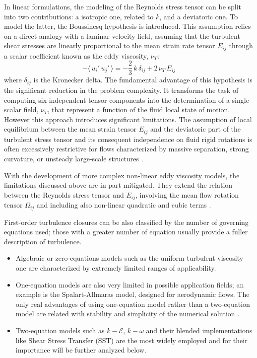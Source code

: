 \documentclass[12pt, a4paper, twoside, openright]{book}
\begin{document}
In linear formulations, the modeling of the Reynolds stress tensor can be split into two contributions: a isotropic one, related to $k$, and a deviatoric one. To model the latter, the Boussinesq hypothesis is introduced. This assumption relies on a direct analogy with a laminar velocity field, assuming that the turbulent shear stresses are linearly proportional to the mean strain rate tensor $E_{ij}$ through a scalar coefficient known as the eddy viscosity, $\nu_T$:
\begin{equation}
	-\langle \, u_i' \, u_j' \, \rangle = - \frac{2}{3} \, k \, \delta_{ij} + 2 \, \nu_T \, E_{ij}
	\label{eq:boussinesq-model}
\end{equation}
where $\delta_{ij}$ is the Kronecker delta. The fundamental advantage of this hypothesis is the significant reduction in the problem complexity. It transforms the task of computing six independent tensor components into the determination of a single scalar field, $\nu_T$, that represent a function of the fluid local state of motion. However this approach introduces significant limitations. The assumption of local equilibrium between the mean strain tensor $E_{ij}$ and the deviatoric part of the turbulent stress tensor and its consequent independence on fluid rigid rotations is often excessively restrictive for flows characterized by massive separation, strong curvature, or unsteady large-scale structures \cite{cfd-blazek} \cite{tubulence-wilcox}.

With the development of more complex non-linear eddy viscosity models, the limitations discussed above are in part mitigated. They extend the relation between the Reynolds stress tensor and $E_{ij}$, involving the mean flow rotation tensor $\Omega_{ij}$ and including also non-linear quadratic and cubic terms \cite{rans-nl-model-lumley}.

First-order turbulence closures can be also classified by the number of governing equations used; those with a greater number of equation usually provide a fuller description of turbulence.
\begin{itemize}
	\item Algebraic or zero-equations models such as the uniform turbulent viscosity one are characterized by extremely limited ranges of applicability.
	\item One-equation models are also very limited in possible application fields; an example is the Spalart-Allmaras model, designed for aerodynamic flows. The only real advantages of using one-equation model rather than a two-equation model are related with stability and simplicity of the numerical solution \cite{tubulence-wilcox}.
	\item Two-equation models such as $k-\mathcal{E}$, $k-\omega$ and their blended implementations like Shear Stress Transfer (SST) are the most widely employed and for their importance will be further analyzed below.
\end{itemize}
\end{document}
